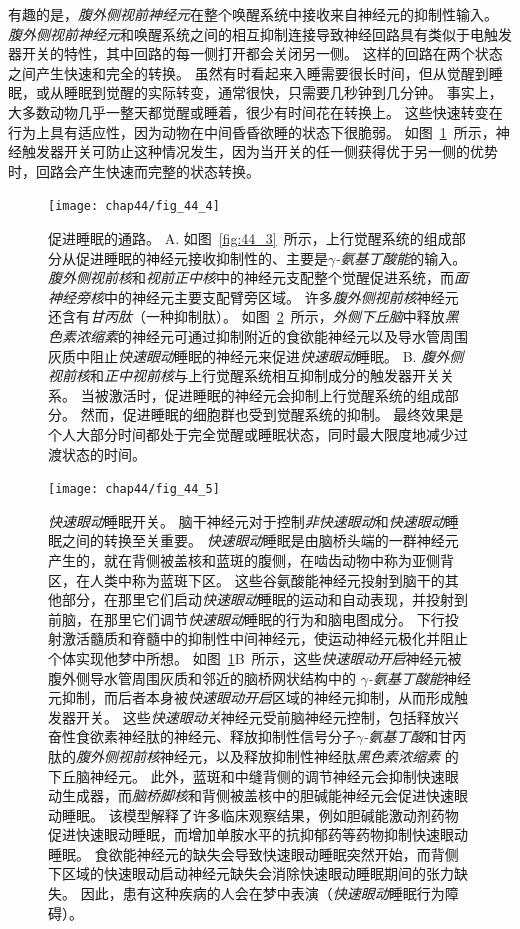 有趣的是，\textit{腹外侧视前神经元}在整个唤醒系统中接收来自神经元的抑制性输入。
\textit{腹外侧视前神经元}和唤醒系统之间的相互抑制连接导致神经回路具有类似于电触发器开关的特性，其中回路的每一侧打开都会关闭另一侧。
这样的回路在两个状态之间产生快速和完全的转换。
虽然有时看起来入睡需要很长时间，但从觉醒到睡眠，或从睡眠到觉醒的实际转变，通常很快，只需要几秒钟到几分钟。
事实上，大多数动物几乎一整天都觉醒或睡着，很少有时间花在转换上。
这些快速转变在行为上具有适应性，因为动物在中间昏昏欲睡的状态下很脆弱。
如图~\ref{fig:44_4}~所示，神经触发器开关可防止这种情况发生，因为当开关的任一侧获得优于另一侧的优势时，回路会产生快速而完整的状态转换。


\begin{figure}[htbp]
	\centering
	\texttt{[image: chap44/fig\_44\_4]}
	\caption{促进睡眠的通路。
		A. 如图~\ref{fig:44_3}~所示，上行觉醒系统的组成部分从促进睡眠的神经元接收抑制性的、主要是\textit{$\gamma$-氨基丁酸能}的输入。
		\textit{腹外侧视前核}和\textit{视前正中核}中的神经元支配整个觉醒促进系统，而\textit{面神经旁核}中的神经元主要支配臂旁区域。
		许多\textit{腹外侧视前核}神经元还含有\textit{甘丙肽}（一种抑制肽）。
		如图~\ref{fig:44_5}~所示，\textit{外侧下丘脑}中释放\textit{黑色素浓缩素}的神经元可通过抑制附近的食欲能神经元以及导水管周围灰质中阻止\textit{快速眼动}睡眠的神经元来促进\textit{快速眼动}睡眠。
		B. \textit{腹外侧视前核}和\textit{正中视前核}与上行觉醒系统相互抑制成分的触发器开关关系。
		当被激活时，促进睡眠的神经元会抑制上行觉醒系统的组成部分。
		然而，促进睡眠的细胞群也受到觉醒系统的抑制。
		最终效果是个人大部分时间都处于完全觉醒或睡眠状态，同时最大限度地减少过渡状态的时间。}
	\label{fig:44_4}
\end{figure}


\begin{figure}[htbp]
	\centering
	\texttt{[image: chap44/fig\_44\_5]}
	\caption{\textit{快速眼动}睡眠开关。
		脑干神经元对于控制\textit{非快速眼动}和\textit{快速眼动}睡眠之间的转换至关重要。
		\textit{快速眼动}睡眠是由脑桥头端的一群神经元产生的，就在背侧被盖核和蓝斑的腹侧，在啮齿动物中称为亚侧背区，在人类中称为蓝斑下区。
		这些谷氨酸能神经元投射到脑干的其他部分，在那里它们启动\textit{快速眼动}睡眠的运动和自动表现，并投射到前脑，在那里它们调节\textit{快速眼动}睡眠的行为和脑电图成分。
		下行投射激活髓质和脊髓中的抑制性中间神经元，使运动神经元极化并阻止个体实现他梦中所想。
		如图~\ref{fig:44_4}B~所示，这些\textit{快速眼动开启}神经元被腹外侧导水管周围灰质和邻近的脑桥网状结构中的 \textit{$\gamma$-氨基丁酸能}神经元抑制，而后者本身被\textit{快速眼动开启}区域的神经元抑制，从而形成触发器开关。
		这些\textit{快速眼动关}神经元受前脑神经元控制，包括释放兴奋性食欲素神经肽的神经元、释放抑制性信号分子\textit{$\gamma$-氨基丁酸}和甘丙肽的\textit{腹外侧视前核}神经元，以及释放抑制性神经肽\textit{黑色素浓缩素} 的下丘脑神经元。
		此外，蓝斑和中缝背侧的调节神经元会抑制快速眼动生成器，而\textit{脑桥脚核}和背侧被盖核中的胆碱能神经元会促进快速眼动睡眠。
		该模型解释了许多临床观察结果，例如胆碱能激动剂药物促进快速眼动睡眠，而增加单胺水平的抗抑郁药等药物抑制快速眼动睡眠。
		食欲能神经元的缺失会导致快速眼动睡眠突然开始，而背侧下区域的快速眼动启动神经元缺失会消除快速眼动睡眠期间的张力缺失。
		因此，患有这种疾病的人会在梦中表演（\textit{快速眼动}睡眠行为障碍）。}
	\label{fig:44_5}
\end{figure}


